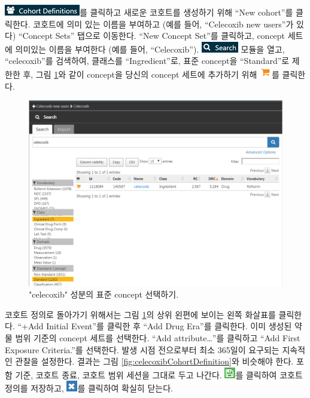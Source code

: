 \documentclass[11pt]{book}
\theoremstyle{definition}
\theoremstyle{definition}
\theoremstyle{definition}
\theoremstyle{remark}
\begin{document}
\includegraphics{images/Cohorts/cohortdefinition.png}를 클릭하고 새로운
코호트를 생성하기 위해 ``New cohort''를 클릭한다. 코호트에 의미 있는
이름을 부여하고 (예를 들어, ``Celecoxib new users''가 있다) ``Concept
Sets'' 탭으로 이동한다. ``New Concept Set''를 클릭하고, concept 세트에
의미있는 이름을 부여한다 (예를 들어, ``Celecoxib'').
\includegraphics{images/Cohorts/search-2.png} 모듈을 열고,
``celecoxib''를 검색하여, 클래스를 ``Ingredient''로, 표준 concept을
``Standard''로 제한한 후, 그림 \ref{fig:conceptSearchAtlas}와 같이
concept을 당신의 concept 세트에 추가하기 위해
\includegraphics{images/Cohorts/shoppingcart.png}를 클릭한다.

\begin{figure}

{\centering \includegraphics[width=1\linewidth]{images/SuggestedAnswers/conceptSearchAtlas} 

}

\caption{"celecoxib" 성분의 표준 concept 선택하기.}\label{fig:conceptSearchAtlas}
\end{figure}

코호트 정의로 돌아가기 위해서는 그림 \ref{fig:conceptSearchAtlas}의 상위
왼편에 보이는 왼쪽 화살표를 클릭한다. ``+Add Initial Event''를 클릭한 후
``Add Drug Era''를 클릭한다. 이미 생성된 약물 범위 기준의 concept 세트를
선택한다. ``Add attribute\ldots{}''를 클릭하고 ``Add First Exposure
Criteria.''를 선택한다. 발생 시점 전으로부터 최소 365일이 요구되는
지속적인 관찰을 설정한다. 결과는 그림
\ref{fig:celecoxibCohortDefinition}와 비슷해야 한다. 포함 기준, 코호트
종료, 코호트 범위 세션을 그대로 두고 나간다.
\includegraphics{images/Cohorts/save.png}를 클릭하여 코호트 정의를
저장하고, \includegraphics{images/SuggestedAnswers/close.png}를 클릭하여
확실히 닫는다.
\end{document}
